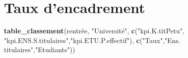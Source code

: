 \documentclass[12pt,french,landscape]{article}
\newenvironment{Shaded}{\begin{snugshade}}{\end{snugshade}}
\newcommand{\KeywordTok}[1]{\textcolor[rgb]{0.13,0.29,0.53}{\textbf{#1}}}
\newcommand{\NormalTok}[1]{#1}
\newcommand{\StringTok}[1]{\textcolor[rgb]{0.31,0.60,0.02}{#1}}
\begin{document}
\newpage

\hypertarget{taux-dencadrement}{%
\section{Taux d'encadrement}\label{taux-dencadrement}}

\begin{Shaded}
\begin{Highlighting}[]
\KeywordTok{table_classement}\NormalTok{(rentrée, }\StringTok{"Université"}\NormalTok{,}
                  \KeywordTok{c}\NormalTok{(}\StringTok{"kpi.K.titPetu"}\NormalTok{, }\StringTok{"kpi.ENS.S.titulaires"}\NormalTok{,}\StringTok{"kpi.ETU.P.effectif"}\NormalTok{),}
                  \KeywordTok{c}\NormalTok{(}\StringTok{"Taux"}\NormalTok{,}\StringTok{"Ens. titulaires"}\NormalTok{,}\StringTok{"Etudiants"}\NormalTok{))}
\end{Highlighting}
\end{Shaded}
\end{document}

